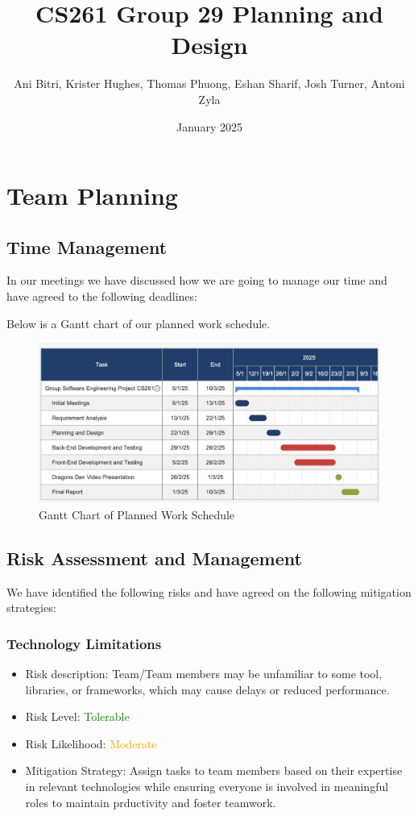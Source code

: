 \documentclass{article}
\title{CS261 Group 29 Planning and Design}
\author{Ani Bitri, Krister Hughes, Thomas Phuong, Eshan Sharif, Josh Turner, Antoni Zyla}
\date{January 2025}
\begin{document}
\maketitle
\tableofcontents

\section{Team Planning}
\subsection{Time Management}
In our meetings we have discussed how we are going to manage our time and have agreed to the following deadlines:

Below is a Gantt chart of our planned work schedule.

\begin{figure}[h!]
    \centering
    \includegraphics[width=\textwidth]{ganttchart.png}
    \caption{Gantt Chart of Planned Work Schedule}
    \label{fig:gantt_chart}
\end{figure}


\subsection{Risk Assessment and Management}
We have identified the following risks and have agreed on the following mitigation strategies:
\subsubsection{Technology Limitations}
\begin{itemize}
    \item Risk description: Team/Team members may be unfamiliar to some tool, libraries, or frameworks, which may cause delays or reduced performance. 
    \item Risk Level: \textcolor{green}{Tolerable}
    \item Risk Likelihood: \textcolor{orange}{Moderate}
    \item Mitigation Strategy: Assign tasks to team members based on their expertise in relevant technologies while ensuring everyone is involved in meaningful roles to maintain prductivity and foster teamwork.
\end{itemize}
\end{document}
